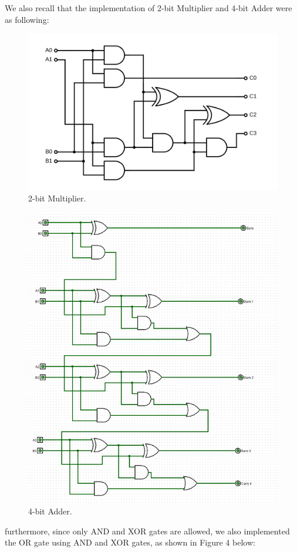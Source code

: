 \documentclass{article}
\begin{document}
We also recall that the implementation of 2-bit Multiplier and 4-bit Adder were as following:
\begin{figure}[H]
    \centering
    \includegraphics[width=0.75\linewidth]{1920px-Binary_multiplier.svg (1).png}
    \caption{2-bit Multiplier.}
    \label{fig:enter-label}
\end{figure}

\begin{figure}[H]
    \centering
    \includegraphics[width=1\linewidth]{F3D2GZ2KNVR5S0C.png}
    \caption{4-bit Adder.}
    \label{fig:enter-label}
\end{figure}
\newpage
furthermore, since only AND and XOR gates are allowed, we also implemented the OR gate using AND and XOR gates, as shown in Figure 4 below:
\end{document}
